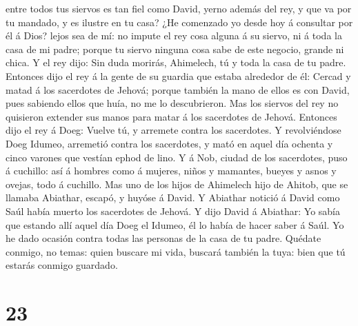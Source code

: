 entre todos tus siervos es tan fiel como David, yerno además del rey, y
que va por tu mandado, y es ilustre en tu casa?  ¿He
comenzado yo desde hoy á consultar por él á Dios? lejos sea de mí: no
impute el rey cosa alguna á su siervo, ni á toda la casa de mi padre;
porque tu siervo ninguna cosa sabe de este negocio, grande ni chica.
 Y el rey dijo: Sin duda morirás, Ahimelech, tú y toda la
casa de tu padre.  Entonces dijo el rey á la gente de su
guardia que estaba alrededor de él: Cercad y matad á los sacerdotes de
Jehová; porque también la mano de ellos es con David, pues sabiendo
ellos que huía, no me lo descubrieron. Mas los siervos del rey no
quisieron extender sus manos para matar á los sacerdotes de Jehová.
 Entonces dijo el rey á Doeg: Vuelve tú, y arremete
contra los sacerdotes. Y revolviéndose Doeg Idumeo, arremetió contra los
sacerdotes, y mató en aquel día ochenta y cinco varones que vestían
ephod de lino.  Y á Nob, ciudad de los sacerdotes, puso á
cuchillo: así á hombres como á mujeres, niños y mamantes, bueyes y asnos
y ovejas, todo á cuchillo.  Mas uno de los hijos de
Ahimelech hijo de Ahitob, que se llamaba Abiathar, escapó, y huyóse á
David.  Y Abiathar notició á David como Saúl había muerto
los sacerdotes de Jehová.  Y dijo David á Abiathar: Yo
sabía que estando allí aquel día Doeg el Idumeo, él lo había de hacer
saber á Saúl. Yo he dado ocasión contra todas las personas de la casa de
tu padre.  Quédate conmigo, no temas: quien buscare mi
vida, buscará también la tuya: bien que tú estarás conmigo guardado.

\hypertarget{section-22}{%
\section{23}\label{section-22}}

